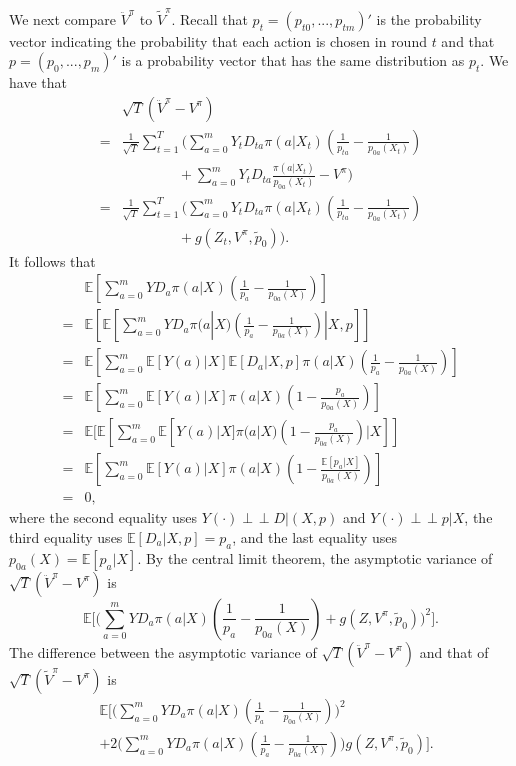 \documentclass[letterpaper]{article} \usepackage{aaai19}  \usepackage{times}  \usepackage{helvet}  \usepackage{courier}  \usepackage{url}  \usepackage{graphicx}  \frenchspacing  \usepackage{comment}
\newcommand{\indep}{\mathop{\perp\!\!\!\!\perp}}
\begin{document}
We next compare $\ddot V^\pi$ to $\tilde V^\pi$.
Recall that $p_t=(p_{t0},...,p_{tm})'$ is the probability vector indicating the probability that each action is chosen in round $t$ and that $p=(p_0,...,p_m)'$ is a probability vector that has the same distribution as $p_t$.
We have that
\begin{align*}
	&\sqrt{T}(\ddot V^{\pi}-V^{\pi})\\
	=&\frac{1}{\sqrt{T}}\sum_{t=1}^T\bigl(\sum_{a=0}^mY_t D_{ta}\pi(a|X_t)(\frac{1}{p_{ta}}-\frac{1}{p_{0a}(X_t)})\\
	&\hspace{4em}+\sum_{a=0}^mY_t D_{ta}\frac{\pi(a|X_t)}{p_{0a}(X_t)}-V^\pi\bigr)\\
	=&\frac{1}{\sqrt{T}}\sum_{t=1}^T \bigl(\sum_{a=0}^mY_t D_{ta}\pi(a|X_t)(\frac{1}{p_{ta}}-\frac{1}{p_{0a}(X_t)})\\
	&\hspace{4em}+g(Z_t,V^{\pi},\tilde p_0)\bigr).
\end{align*}
It follows that
\begin{align*}
	&\mathbb{E}[\sum_{a=0}^mY D_a\pi(a|X)(\frac{1}{p_a}-\frac{1}{p_{0a}(X)})]\\
	=&\mathbb{E}[\mathbb{E}[\sum_{a=0}^mY D_a\pi(a|X)(\frac{1}{p_a}-\frac{1}{p_{0a}(X)})|X,p]]\\
	=&\mathbb{E}[\sum_{a=0}^m\mathbb{E}[Y(a)|X] \mathbb{E}[D_a|X,p]\pi(a|X)(\frac{1}{p_a}-\frac{1}{p_{0a}(X)})]\\
	=&\mathbb{E}[\sum_{a=0}^m\mathbb{E}[Y(a)|X] \pi(a|X)(1-\frac{p_a}{p_{0a}(X)})]\\
	=&\mathbb{E}[\mathbb{E}[\sum_{a=0}^m\mathbb{E}[Y(a)|X] \pi(a|X)(1-\frac{p_a}{p_{0a}(X)})|X]]\\
	=&\mathbb{E}[\sum_{a=0}^m\mathbb{E}[Y(a)|X] \pi(a|X)(1-\frac{\mathbb{E}[p_a|X]}{p_{0a}(X)})]\\
	=&0,
\end{align*}
where the second equality uses $Y(\cdot)\indep D|(X,p)$ and $Y(\cdot)\indep p|X$, the third equality uses $\mathbb{E}[D_a|X,p]=p_a$, and the last equality uses $p_{0a}(X)=\mathbb{E}[p_a|X]$.
By the central limit theorem, the asymptotic variance of $\sqrt{T}(\ddot V^{\pi}-V^{\pi})$ is
$$
\mathbb{E}\bigl[\bigl(\sum_{a=0}^mY D_a\pi(a|X)(\frac{1}{p_a}-\frac{1}{p_{0a}(X)})+g(Z,V^{\pi},\tilde p_0)\bigr)^2\bigr].
$$
The difference between the asymptotic variance of $\sqrt{T}(\ddot V^{\pi}-V^{\pi})$ and that of $\sqrt{T}(\tilde V^{\pi}-V^{\pi})$ is
\begin{align*}
	&\mathbb{E}\bigl[\bigl(\sum_{a=0}^mY D_a\pi(a|X)(\frac{1}{p_a}-\frac{1}{p_{0a}(X)})\bigr)^2\\
	&+2\bigl(\sum_{a=0}^mY D_a\pi(a|X)(\frac{1}{p_a}-\frac{1}{p_{0a}(X)})\bigr)g(Z,V^{\pi},\tilde p_0)\bigr].
\end{align*}
\end{document}
